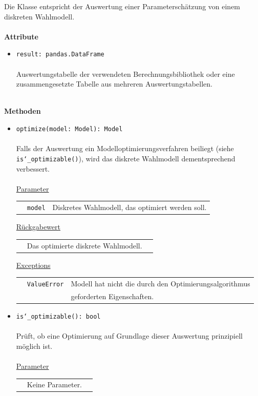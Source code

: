 \documentclass{article}
\begin{document}
\begin{itemize}
Die Klasse entspricht der Auswertung einer Parameterschätzung von einem diskreten Wahlmodell.
\\\\

\textbf{Attribute}
\begin{itemize}\setlength\itemsep{3em}
\item \texttt{result: pandas.DataFrame}\\\\
Auswertungstabelle der verwendeten Berechnungsbibliothek oder eine zusammengesetzte Tabelle aus mehreren Auswertungstabellen.
\\\\
\end{itemize}

\textbf{Methoden}
\begin{itemize}\setlength\itemsep{3em}
\item \texttt{optimize(model: Model): Model}\\\\
Falls der Auswertung ein Modelloptimierungsverfahren beiliegt (siehe \texttt{is\char`_optimizable()}), wird das diskrete Wahlmodell dementsprechend verbessert.\\\\
\underline{Parameter}\\
\begin{tabular}{lll}
 & \texttt{model} & Diskretes Wahlmodell, das optimiert werden soll.\\
\end{tabular}

\underline{Rückgabewert}\\
\begin{tabular}{lll}
 & Das optimierte diskrete Wahlmodell.\\
\end{tabular}

\underline{Exceptions}\\
\begin{tabular}{lll}
 & \texttt{ValueError} & Modell hat nicht die durch den Optimierungsalgorithmus\\
 && geforderten Eigenschaften.\\
\end{tabular}

\item \texttt{is\char`_optimizable(): bool}\\\\
Prüft, ob eine Optimierung auf Grundlage dieser Auswertung prinzipiell möglich ist.\\\\
\underline{Parameter}\\
\begin{tabular}{lll}
 & Keine Parameter.
\end{tabular}


\end{itemize}
\end{itemize}
\end{document}
